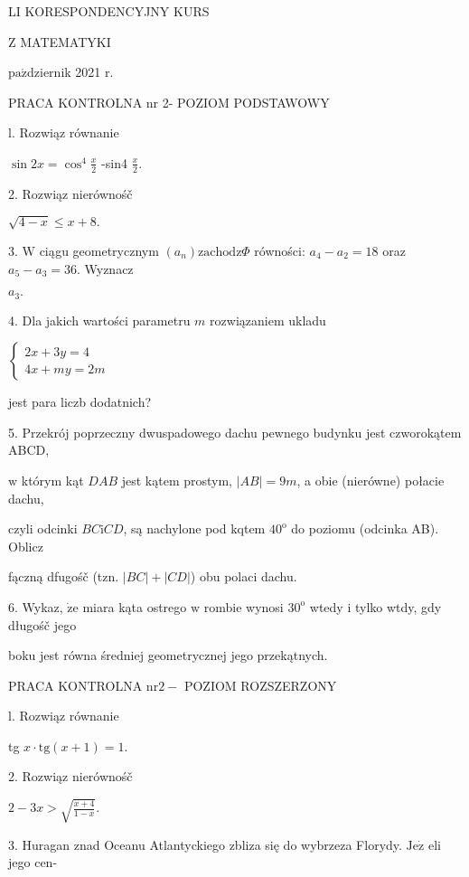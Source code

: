 \documentclass[a4paper,12pt]{article}
\begin{document}
LI KORESPONDENCYJNY KURS

Z MATEMATYKI

$\mathrm{p}\mathrm{a}\acute{\mathrm{z}}$dziernik 2021 $\mathrm{r}.$

PRACA KONTROLNA nr 2- POZIOM PODSTAWOWY

l. Rozwiąz równanie

$\displaystyle \sin 2x=\cos^{4}\frac{x}{2}$ -sin4 $\displaystyle \frac{x}{2}.$

2. Rozwiąz nierównośč

$\sqrt{4-x}\leq x+8.$

3. $\mathrm{W}$ ciągu geometrycznym $(a_{n})\mathrm{z}\mathrm{a}\mathrm{c}\mathrm{h}\mathrm{o}\mathrm{d}\mathrm{z}\Phi$ równości: $a_{4}-a_{2}=18$ oraz $a_{5}-a_{3}=36$. Wyznacz

$a_{3}.$

4. Dla jakich wartości parametru $m$ rozwiązaniem ukladu

$\left\{\begin{array}{l}
2x+3y=4\\
4x+my=2m
\end{array}\right.$

jest para liczb dodatnich?

5. Przekrój poprzeczny dwuspadowego dachu pewnego budynku jest czworokątem ABCD,

$\mathrm{w}$ którym kąt $DAB$ jest kątem prostym, $|AB| =9m$, a obie (nierówne) połacie dachu,

czyli odcinki $BC\mathrm{i}CD$, są nachylone pod kqtem $40^{\mathrm{o}}$ do poziomu (odcinka AB). Oblicz

fączną dfugośč (tzn. $|BC|+|CD|$) obu polaci dachu.

6. Wykaz, $\dot{\mathrm{z}}\mathrm{e}$ miara kąta ostrego $\mathrm{w}$ rombie wynosi $30^{\mathrm{o}}$ wtedy $\mathrm{i}$ tylko wtdy, gdy długośč jego

boku jest równa średniej geometrycznej jego przekątnych.




PRACA KONTROLNA $\mathrm{n}\mathrm{r} 2-$ POZIOM ROZSZERZONY

l. Rozwiąz równanie

tg $x\cdot \mathrm{t}\mathrm{g}(x+1)=1.$

2. Rozwiąz nierównośč

$2-3x>\sqrt{\frac{x+4}{1-x}}.$

3. Huragan znad Oceanu Atlantyckiego zbliza się do wybrzeza Florydy. $\mathrm{J}\mathrm{e}\dot{\mathrm{z}}$ eli jego cen-
\end{document}
